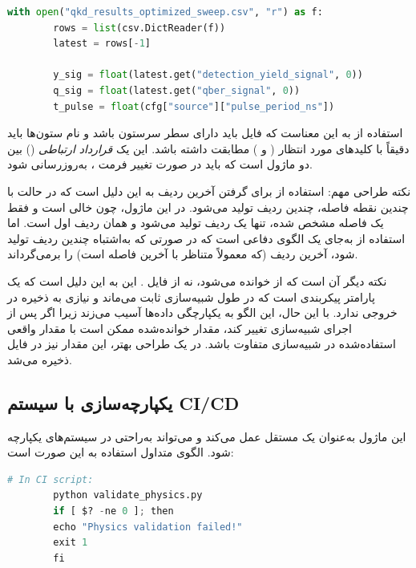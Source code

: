 \begin{LTR}
	\begin{lstlisting}[language=Python]
		with open("qkd_results_optimized_sweep.csv", "r") as f:
		rows = list(csv.DictReader(f))
		latest = rows[-1]
		
		y_sig = float(latest.get("detection_yield_signal", 0))
		q_sig = float(latest.get("qber_signal", 0))
		t_pulse = float(cfg["source"]["pulse_period_ns"])
	\end{lstlisting}
\end{LTR}

استفاده از  به این معناست که فایل  باید دارای سطر سرستون باشد و نام ستون‌ها باید دقیقاً با کلیدهای مورد انتظار ( و ) مطابقت داشته باشد. این یک \emph{قرارداد ارتباطی} () بین دو ماژول است که باید در صورت تغییر فرمت ، به‌روزرسانی شود.

نکته طراحی مهم: استفاده از  برای گرفتن آخرین ردیف به این دلیل است که در حالت  با چندین نقطه فاصله، چندین ردیف تولید می‌شود. در این ماژول، چون  خالی است و فقط یک فاصله مشخص شده، تنها یک ردیف تولید می‌شود و  همان ردیف اول است. اما استفاده از  به‌جای  یک الگوی دفاعی است که در صورتی که به‌اشتباه چندین ردیف تولید شود، آخرین ردیف (که معمولاً متناظر با آخرین فاصله است) را برمی‌گرداند.

نکته دیگر آن است که  از  خوانده می‌شود، نه از فایل . این به این دلیل است که  یک پارامتر پیکربندی است که در طول شبیه‌سازی ثابت می‌ماند و نیازی به ذخیره در خروجی ندارد. با این حال، این الگو به یکپارچگی داده‌ها آسیب می‌زند زیرا اگر  پس از اجرای شبیه‌سازی تغییر کند، مقدار خوانده‌شده ممکن است با مقدار واقعی استفاده‌شده در شبیه‌سازی متفاوت باشد. در یک طراحی بهتر، این مقدار نیز در فایل  ذخیره می‌شد.

\subsection{یکپارچه‌سازی با سیستم CI/CD}

این ماژول به‌عنوان یک  مستقل عمل می‌کند و می‌تواند به‌راحتی در سیستم‌های  یکپارچه شود. الگوی متداول استفاده به این صورت است:

\begin{LTR}
	\begin{lstlisting}[language=Python]
		# In CI script:
		python validate_physics.py
		if [ $? -ne 0 ]; then
		echo "Physics validation failed!"
		exit 1
		fi
	\end{lstlisting}
\end{LTR}

